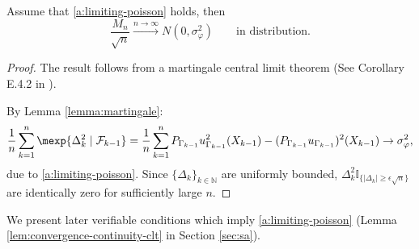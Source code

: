 \begin{lemma}
   \label{lem:martingale-term-clt}
Assume that \ref{a:limiting-poisson} holds, then
\[
   \frac{M_n}{\sqrt{n}} \xrightarrow{n\to\infty} N(0,\sigma_\varphi^2) \qquad \text{in distribution.}
\]
\end{lemma}
\begin{proof}
   The result follows from a martingale central limit theorem (See Corollary E.4.2 in \cite{douc2018markov}). 
   
   By Lemma \ref{lemma:martingale}:
   $$
   \frac{1}{n} \sum_{k=1}^n \mexp{\Delta_k^2 \mid \mathcal{F}_{k-1}}
   = \frac{1}{n} \sum_{k=1}^n 
   {P_{\Gamma_{k-1}} u_{\Gamma_{k-1}}^2 (X_{k-1}) - (P_{\Gamma_{k-1}} u_{\Gamma_{k-1}})^2(X_{k-1})} 
   \to \sigma_{\varphi}^2,
   $$
   due to \ref{a:limiting-poisson}. Since $\{ \Delta_k \}_{k \in \mathbb{N}}$ are uniformly bounded, $\Delta_k^2 \mathbb{I}_{\{|\Delta_k| \ge \epsilon \sqrt{n}\}}$ are identically zero for sufficiently large $n$.
\end{proof}

We present later verifiable conditions which imply \ref{a:limiting-poisson} (Lemma \ref{lem:convergence-continuity-clt} in Section \ref{sec:sa}).






